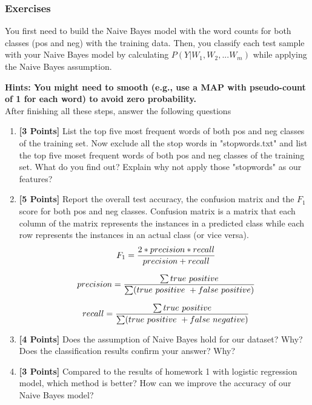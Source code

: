 \documentclass{article}
\begin{document}
\subsubsection*{Exercises}
You first need to build the Naive Bayes model with the word counts for both classes (pos and neg) with the training data. Then, you classify each test sample with your Naive Bayes model by calculating  $P(Y | W_1, W_2, ...W_m)$ while applying the Naive Bayes assumption.

 \textbf{Hints: You might need to smooth (e.g., use a MAP with pseudo-count of 1 for each word) to avoid zero probability. }
\\ After finishing all these steps, answer the following questions

\begin{enumerate}
	\item \textbf{[3 Points]} List the top five most frequent words of both pos and neg classes of the training set. Now exclude all the stop words in "stopwords.txt" and list the top five moset frequent words of both pos and neg classes of the training set. What do you find out? Explain why not apply those "stopwords" as our features?  
	
 	\item \textbf{[5 Points]} Report the overall test accuracy, the confusion matrix and the $F_1$ score for both pos and neg classes. Confusion matrix is a matrix that each column of the matrix represents the instances in a predicted class while each row represents the instances in an actual class (or vice versa).   
	\begin{equation}\label{eqn:f1score}
	\ F_1 =  {2*precision*recall\over precision + recall}
	\end{equation}
	
	\begin{equation}\label{eqn:precision}
	\ precision =  {\sum true\ positive\over \sum (true\ positive\ +  false\ positive)}
	\end{equation}
	
	\begin{equation}\label{eqn:recall}
	\ recall =  {\sum true\ positive\over \sum (true\ positive\ +  false\ negative)}
	\end{equation}
	
	\item \textbf{[4 Points]} Does the assumption of Naive Bayes hold for our dataset? Why? Does the classification results confirm your answer? Why?
	
	\item \textbf{[3 Points]} Compared to the results of homework 1 with logistic regression model, which method is better? How can we improve the accuracy of our Naive Bayes model?
	
\end{enumerate}
\end{document}
